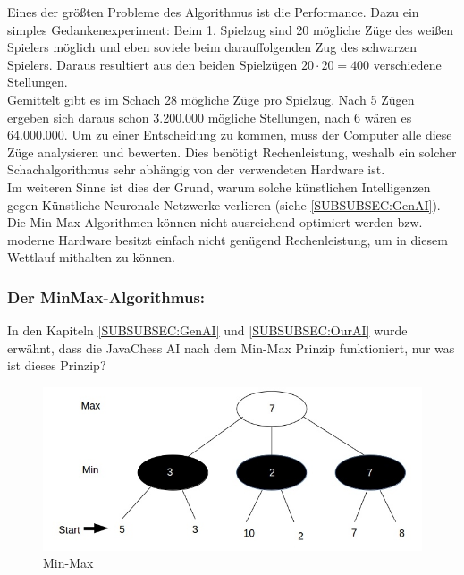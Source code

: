 \documentclass[12pt,a4paper]{article}
\begin{document}
{Eines der größten Probleme des Algorithmus ist die Performance. Dazu ein simples Gedankenexperiment: Beim 1. Spielzug sind 20 mögliche Züge des weißen Spielers möglich und eben soviele beim darauffolgenden Zug des schwarzen Spielers. Daraus resultiert aus den beiden Spielzügen \(20 \cdot 20 = 400\) verschiedene Stellungen. \\
Gemittelt gibt es im Schach 28 mögliche Züge pro Spielzug. Nach 5 Zügen ergeben sich daraus schon 3.200.000 mögliche Stellungen, nach 6 wären es 64.000.000. Um zu einer Entscheidung zu kommen, muss der Computer alle diese Züge analysieren und bewerten. Dies benötigt Rechenleistung, weshalb ein solcher Schachalgorithmus sehr abhängig von der verwendeten Hardware ist. \\
Im weiteren Sinne ist dies der Grund, warum solche künstlichen Intelligenzen gegen Künstliche-Neuronale-Netzwerke verlieren (siehe \ref{SUBSUBSEC:GenAI}). Die Min-Max Algorithmen können nicht ausreichend optimiert werden bzw. moderne Hardware besitzt einfach nicht genügend Rechenleistung, um in diesem Wettlauf mithalten zu können. \\

\subsubsection{Der MinMax-Algorithmus:}
\label{SUBSUBSEC:MinMax}

In den Kapiteln \ref{SUBSUBSEC:GenAI} und \ref{SUBSUBSEC:OurAI} wurde erwähnt, dass die JavaChess AI nach dem Min-Max Prinzip funktioniert, nur was ist dieses Prinzip?

\begin{figure}[H]
  \centering
   	\includegraphics[width=16cm]{graphics/MinMax.jpg}
  \caption{Min-Max}
  \label{FIG:MINMAX}
\end{figure}


}
\end{document}
